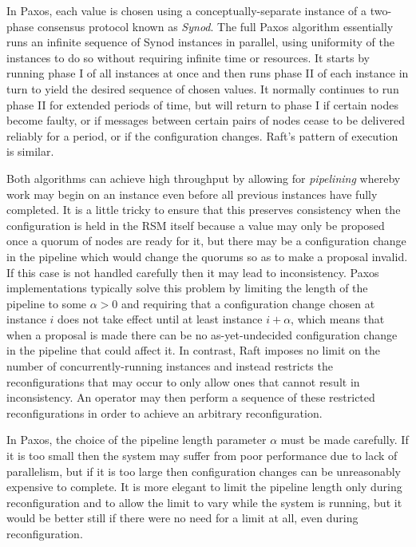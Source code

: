 \documentclass[journal]{IEEEtran}
\begin{document}
In Paxos, each value is chosen using a conceptually-separate instance of a
two-phase consensus protocol known as \textit{Synod}. The full Paxos algorithm
essentially runs an infinite sequence of Synod instances in parallel, using
uniformity of the instances to do so without requiring infinite time or
resources.  It starts by running phase I of all instances at once and then runs
phase II of each instance in turn to yield the desired sequence of chosen
values. It normally continues to run phase II for extended periods of time, but
will return to phase I if certain nodes become faulty, or if messages between
certain pairs of nodes cease to be delivered reliably for a period, or if the
configuration changes.  Raft's pattern of execution is similar.

Both algorithms can achieve high throughput by allowing for \textit{pipelining}
\cite{smart} whereby work may begin on an instance even before all previous
instances have fully completed. It is a little tricky to ensure that this
preserves consistency when the configuration is held in the RSM itself because
a value may only be proposed once a quorum of nodes are ready for it, but there
may be a configuration change in the pipeline which would change the quorums so
as to make a proposal invalid. If this case is not handled carefully then it
may lead to inconsistency. Paxos implementations typically solve this problem
by limiting the length of the pipeline to some $\alpha > 0$ and requiring that
a configuration change chosen at instance $i$ does not take effect until at
least instance $i + \alpha$, which means that when a proposal is made there can
be no as-yet-undecided configuration change in the pipeline that could affect
it. In contrast, Raft imposes no limit on the number of concurrently-running
instances and instead restricts the reconfigurations that may occur to only
allow ones that cannot result in inconsistency. An operator may then perform a
sequence of these restricted reconfigurations in order to achieve an arbitrary
reconfiguration.

In Paxos, the choice of the pipeline length parameter $\alpha$ must be made
carefully. If it is too small then the system may suffer from poor performance
due to lack of parallelism, but if it is too large then configuration changes
can be unreasonably expensive to complete. It is more
elegant\cite{reconfiguring-a-state-machine} to limit the pipeline length only
during reconfiguration and to allow the limit to vary while the system is
running, but it would be better still if there were no need for a limit at all,
even during reconfiguration.
\end{document}
